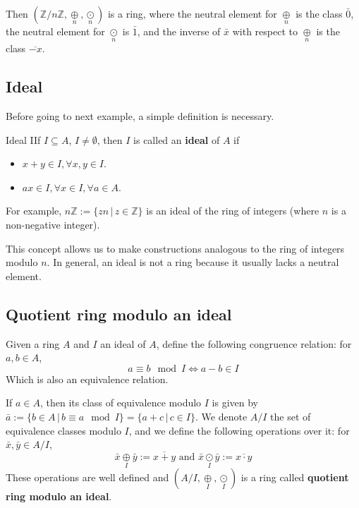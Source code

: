 \documentclass[12pt,a4paper]{article}
\begin{document}
Then $(\mathbb{Z}/n \mathbb{Z}, \underset{n}{\oplus}, \underset{n}{\odot})$ is a ring, where the neutral element for $\underset{n}{\oplus}$ is the class $\bar{0}$, the neutral element for $\underset{n}{\odot}$ is $\bar{1}$, and the inverse of $\bar{x}$ with respect to $\underset{n}{\oplus}$ is the class $\overline{-x}$.

\subsection{Ideal}

Before going to next example, a simple definition is necessary.

\begin{defn}{Ideal}
IIf \(I \subseteq A\), $I \neq \emptyset$, then \(I\) is called an \textbf{ideal} of \(A\) if
\begin{itemize}
\item
  \(x+y \in I, \forall x, y \in I\).
\item
  \(ax \in I, \forall x \in I, \forall a \in A\).
\end{itemize}
\end{defn}

For example, \(n \mathbb{Z} := \{zn \, | \, z \in \mathbb{Z} \}\) is an ideal of the ring of integers (where \(n\) is a non-negative integer).

This concept allows us to make constructions analogous to the ring of integers modulo \(n\). In general, an ideal is not a ring because it usually lacks a neutral element.

\subsection{Quotient ring modulo an ideal}

Given a ring $A$ and $I$ an ideal of $A$, define the following congruence relation: for $a, b \in A$,
\[a \equiv b \mod I \iff a- b \in I  \]
Which is also an equivalence relation.

If $a \in A$, then its class of equivalence modulo $I$ is given by \(\bar{a} := \{ b \in A \, | \, b \equiv a \mod I \} = \{ a + c \, | \, c \in I \}\). We denote $A/I$ the set of equivalence classes modulo $I$, and we define the following operations over it: for $\bar{x}, \bar{y} \in A/I$, 
\[
\bar{x} \underset{I}{\oplus} \bar{y} := \overline{x+y} \text{ and } \bar{x} \underset{I}{\odot} \bar{y} := \overline{x\cdot y}
\]
These operations are well defined and $(A/I, \underset{I}{\oplus},  \underset{I}{\odot})$ is a ring called \textbf{quotient ring modulo an ideal}.
\end{document}
